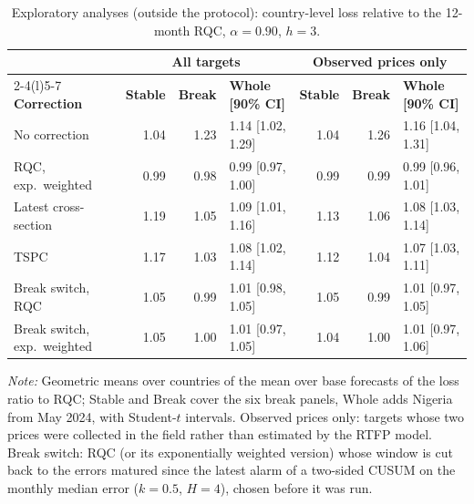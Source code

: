 \begin{table}[t]
\caption{Exploratory analyses (outside the protocol): country-level loss relative to the 12-month RQC, $\alpha=0.90$, $h=3$.\label{tab:explore}}
\centering\footnotesize
\begin{tabular*}{\textwidth}{@{\extracolsep\fill}l rrl rrl@{}}
\toprule
 & \multicolumn{3}{c}{\textbf{All targets}} & \multicolumn{3}{c}{\textbf{Observed prices only}} \\
\cmidrule(lr){2-4}\cmidrule(l){5-7}
\textbf{Correction} & \textbf{Stable} & \textbf{Break} & \textbf{Whole [90\% CI]} & \textbf{Stable} & \textbf{Break} & \textbf{Whole [90\% CI]} \\
\midrule
No correction & 1.04 & 1.23 & 1.14 [1.02, 1.29] & 1.04 & 1.26 & 1.16 [1.04, 1.31] \\
RQC, exp.\ weighted & 0.99 & 0.98 & 0.99 [0.97, 1.00] & 0.99 & 0.99 & 0.99 [0.96, 1.01] \\
Latest cross-section & 1.19 & 1.05 & 1.09 [1.01, 1.16] & 1.13 & 1.06 & 1.08 [1.03, 1.14] \\
TSPC & 1.17 & 1.03 & 1.08 [1.02, 1.14] & 1.12 & 1.04 & 1.07 [1.03, 1.11] \\
Break switch, RQC & 1.05 & 0.99 & 1.01 [0.98, 1.05] & 1.05 & 0.99 & 1.01 [0.97, 1.05] \\
Break switch, exp.\ weighted & 1.05 & 1.00 & 1.01 [0.97, 1.05] & 1.04 & 1.00 & 1.01 [0.97, 1.06] \\
\bottomrule
\end{tabular*}
\begin{tablenotes}\footnotesize
\item \emph{Note:} Geometric means over countries of the mean over base forecasts of the loss ratio to RQC; Stable and Break cover the six break panels, Whole adds Nigeria from May 2024, with Student-$t$ intervals. Observed prices only: targets whose two prices were collected in the field rather than estimated by the RTFP model. Break switch: RQC (or its exponentially weighted version) whose window is cut back to the errors matured since the latest alarm of a two-sided CUSUM on the monthly median error ($k=0.5$, $H=4$), chosen before it was run.
\end{tablenotes}
\end{table}
